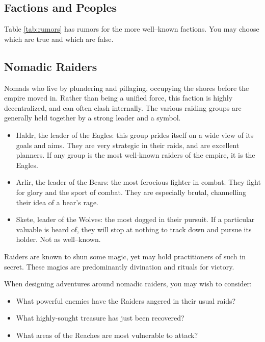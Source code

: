\documentclass[notitlepage]{article}
\begin{document}
\begin{multicols}{2}
  \section{Factions and Peoples}

  Table \ref{tab:rumors} has rumors for the more well--known factions.
  You may choose which are true and which are false.

  \subsection*{Nomadic Raiders}

  Nomads who live by plundering and pillaging, occupying the shores before the empire moved in.
  Rather than being a unified force, this faction is highly decentralized, and can often clash internally.
  The various raiding groups are generally held together by a strong leader and a symbol.

  \begin{itemize}
  \item Haldr, the leader of the Eagles: this group prides itself on a wide view of its goals and aims. They are very strategic in their raids, and are excellent planners. If any group is the most well-known raiders of the empire, it is the Eagles.
  \item Arlir, the leader of the Bears: the most ferocious fighter in combat. They fight for glory and the sport of combat. They are especially brutal, channelling their idea of a bear's rage.
  \item Skete, leader of the Wolves: the most dogged in their pursuit. If a particular valuable is heard of, they will stop at nothing to track down and pursue its holder. Not as well--known.
  \end{itemize}

  Raiders are known to shun some magic, yet may hold practitioners of such in secret. These magics are predominantly divination and rituals for victory.

  When designing adventures around nomadic raiders, you may wish to consider:

  \begin{itemize}
  \item What powerful enemies have the Raiders angered in their usual raids?
  \item What highly-sought treasure has just been recovered?
  \item What areas of the Reaches are most vulnerable to attack?
  \end{itemize}


\end{multicols}
\end{document}
